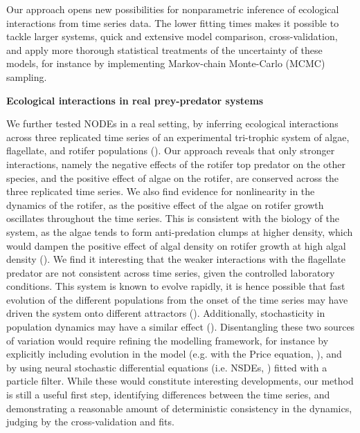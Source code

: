 \documentclass[11pt, oneside]{article}
\begin{document}
Our approach opens new possibilities for nonparametric inference of ecological interactions from time series data.
The lower fitting times makes it possible to tackle larger systems, quick and extensive model comparison, cross-validation, and apply more thorough statistical treatments of the uncertainty of these models, for instance by implementing Markov-chain Monte-Carlo (MCMC) sampling.

\textbf{Ecological interactions in real prey-predator systems}

We further tested NODEs in a real setting, by inferring ecological interactions across three replicated time series of an experimental tri-trophic system of algae, flagellate, and rotifer populations (\cite{Hiltunen2013}). 
Our approach reveals that only stronger interactions, namely the negative effects of the rotifer top predator on the other species, and the positive effect of algae on the rotifer, are conserved across the three replicated time series.
We also find evidence for nonlinearity in the dynamics of the rotifer, as the positive effect of the algae on rotifer growth oscillates throughout the time series. 
This is consistent with the biology of the system, as the algae tends to form anti-predation clumps at higher density, which would dampen the positive effect of algal density on rotifer growth at high algal density (\cite{Yoshida2003,Hiltunen2013}).
We find it interesting that the weaker interactions with the flagellate predator are not consistent across time series, given the controlled laboratory conditions.
This system is known to evolve rapidly, it is hence possible that fast evolution of the different populations from the onset of the time series may have driven the system onto different attractors (\cite{Yoshida2003,Yoshida2007,Hiltunen2013}).
Additionally, stochasticity in population dynamics may have a similar effect (\cite{Dallas2021}).
Disentangling these two sources of variation would require refining the modelling framework, for instance by explicitly including evolution in the model (e.g. with the Price equation, \cite{Ellner2011}), and by using neural stochastic differential equations (i.e. NSDEs, \cite{Rackauckas2019}) fitted with a particle filter. 
While these would constitute interesting developments, our method is still a useful first step, identifying differences between the time series, and demonstrating a reasonable amount of deterministic consistency in the dynamics, judging by the cross-validation and fits.
\end{document}
